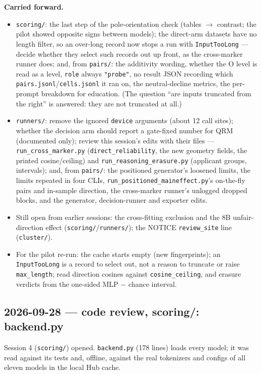 \documentclass{article}
\begin{document}
\textbf{Carried forward.}
\begin{itemize}
  \item \texttt{scoring/}: the last step of the pole-orientation check (tables $\to$ contrast; the pilot showed
        opposite signs between models); the direct-arm datasets have no length filter, so an over-long record now
        stops a run with \texttt{InputTooLong} --- decide whether they select such records out up front, as the
        cross-marker runner does; and, from \texttt{pairs/}: the additivity wording, whether the O level is read
        as a level, \texttt{role} always \texttt{"probe"}, no result JSON recording which
        \texttt{pairs.jsonl}/\texttt{cells.jsonl} it ran on, the neutral-decline metrics, the per-prompt breakdown for
        education. (The question ``are inputs truncated from the right'' is answered: they are not truncated at
        all.)
  \item \texttt{runners/}: remove the ignored \texttt{device} arguments (about 12 call sites); whether the decision
        arm should report a gate-fixed number for QRM (documented only); review this session's edits with their
        files --- \texttt{run\_cross\_marker.py} (\texttt{direct\_reliability}, the new geometry fields, the printed
        cosine/ceiling) and \texttt{run\_reasoning\_erasure.py} (applicant groups, intervals); and, from
        \texttt{pairs/}: the positioned generator's loosened limits, the limits repeated in four CLIs,
        \texttt{run\_positioned\_maineffect.py}'s on-the-fly pairs and in-sample direction, the cross-marker runner's
        unlogged dropped blocks, and the generator, decision-runner and exporter edits.
  \item Still open from earlier sessions: the cross-fitting exclusion and the 8B unfair-direction effect
        (\texttt{scoring/}/\texttt{runners/}); the NOTICE \texttt{review\_site} line (\texttt{cluster/}).
  \item For the pilot re-run: the cache starts empty (new fingerprints); an \texttt{InputTooLong} is a record to
        select out, not a reason to truncate or raise \texttt{max\_length}; read direction cosines against
        \texttt{cosine\_ceiling}, and erasure verdicts from the one-sided MLP $-$ chance interval.
\end{itemize}

\subsection*{2026-09-28 --- code review, scoring/: backend.py}
Session 4 (\texttt{scoring/}) opened. \texttt{backend.py} (178 lines) loads every model; it was read against its
tests and, offline, against the real tokenizers and configs of all eleven models in the local Hub cache.
\end{document}
